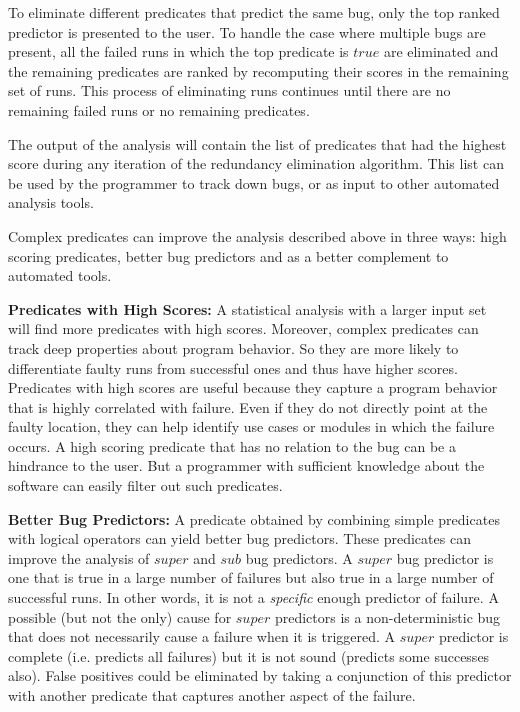 To eliminate different predicates that predict the same bug, only the top ranked predictor is presented to the user.  To handle the case where multiple bugs are present, all the failed runs in which the top predicate is $true$ are eliminated and the remaining predicates are ranked by recomputing their scores in the remaining set of runs.  This process of eliminating runs continues until there are no remaining failed runs or no remaining predicates.  

The output of the analysis will contain the list of predicates that had the highest score during any iteration of the redundancy elimination algorithm.  This list can be used by the programmer to track down bugs, or as input to other automated analysis tools.
 
Complex predicates can improve the analysis described above in three ways: high scoring predicates, better bug predictors and as a better complement to automated tools.

\vspace{4pt} \noindent
{\bf Predicates with High Scores:} A statistical analysis with a larger input set will find more predicates with high scores.  Moreover, complex predicates can track deep properties about program behavior.  So they are more likely to differentiate faulty runs from successful ones and thus have higher scores.  Predicates with high scores are useful because they capture a program behavior that is highly correlated with failure.  Even if they do not directly point at the faulty location, they can help identify use cases or modules in which the failure occurs.  A high scoring predicate that has no relation to the bug can be a hindrance to the user.  But a programmer with sufficient knowledge about the software can easily filter out such predicates.

\vspace{4pt} \noindent
{\bf Better Bug Predictors:} A predicate obtained by combining simple predicates with logical operators can yield better bug predictors.  These predicates can improve the analysis of $super$ and $sub$ bug predictors.  A $super$ bug predictor is one that is true in a large number of failures but also true in a large number of successful runs.  In other words, it is not a {\em specific} enough predictor of failure.  A possible (but not the only) cause for $super$ predictors is a non-deterministic bug that does not necessarily cause a failure when it is triggered.  A $super$ predictor is complete (i.e. predicts all failures) but it is not sound (predicts some successes also).  False positives could be eliminated by taking a conjunction of this predictor with another predicate that captures another aspect of the failure.

